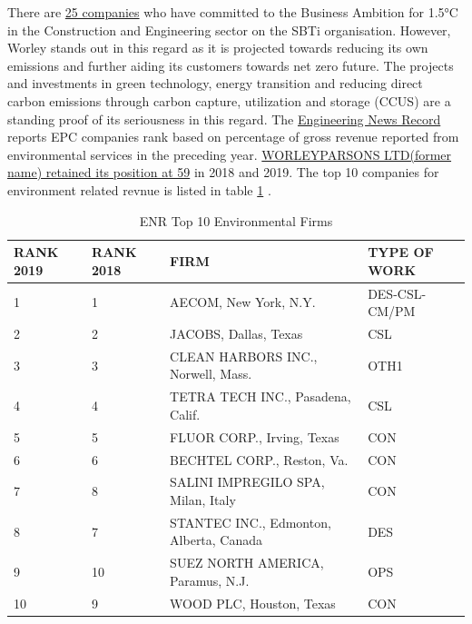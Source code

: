 \documentclass[11pt,a4paper,]{article}
\begin{document}
There are \href{https://sciencebasedtargets.org/companies-taking-action?sector=Construction\%20and\%20Engineering\&ambitionToggle=1\#table}{25 companies} who have committed to the Business Ambition for 1.5°C in the Construction and Engineering sector on the SBTi organisation. However, Worley stands out in this regard as it is projected towards reducing its own emissions and further aiding its customers towards net zero future. The projects and investments in green technology, energy transition and reducing direct carbon emissions through carbon capture, utilization and storage (CCUS) are a standing proof of its seriousness in this regard. The \href{https://www.enr.com/toplists/2020-Top-200-Environmental-Firms-Preview}{Engineering News Record} reports EPC companies rank based on percentage of gross revenue reported from environmental services in the preceding year. \href{https://www.enr.com/toplists/2019-Top-200-Environmental-Firms-1}{WORLEYPARSONS LTD(former name) retained its position at 59} in 2018 and 2019. The top 10 companies for environment related revnue is listed in table \ref{tab:enr} \textcite{enr}.

\begin{table}[!h]

\caption{\label{tab:enr}ENR Top 10 Environmental Firms}
\centering
\begin{tabular}[t]{l|l|l|l}
\hline
RANK 2019 & RANK 2018 & FIRM & TYPE OF WORK\\
\hline
1 & 1 & AECOM, New York, N.Y. & DES-CSL-CM/PM\\
\hline
2 & 2 & JACOBS, Dallas, Texas & CSL\\
\hline
3 & 3 & CLEAN HARBORS INC., Norwell, Mass. & OTH1\\
\hline
4 & 4 & TETRA TECH INC., Pasadena, Calif. & CSL\\
\hline
5 & 5 & FLUOR CORP., Irving, Texas & CON\\
\hline
6 & 6 & BECHTEL CORP., Reston, Va. & CON\\
\hline
7 & 8 & SALINI IMPREGILO SPA, Milan, Italy & CON\\
\hline
8 & 7 & STANTEC INC., Edmonton, Alberta, Canada & DES\\
\hline
9 & 10 & SUEZ NORTH AMERICA, Paramus, N.J. & OPS\\
\hline
10 & 9 & WOOD PLC, Houston, Texas & CON\\
\hline
\end{tabular}
\end{table}

\newpage
\end{document}

